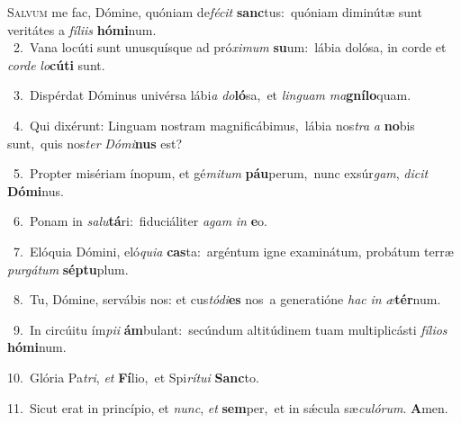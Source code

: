 \lettrine{\initial\textcolor{\initialcolor}{S}}{alvum} me fac, Dómine, quóniam de\-\textit{fé}\-\textit{cit} \textbf{sanc}\-tus:~\star quóniam diminútæ sunt veritátes a \textit{fí}\-\textit{li}\textit{is} \textbf{hó}\-\textbf{mi}num.\\
{\numbfont\textcolor{\numbcolor}{~2.}}~Vana locúti sunt unusquísque ad pró\-\textit{xi}\-\textit{mum} \textbf{su}\-um:~\star lábia dolósa, in corde et \textit{cor}\-\textit{de} \textit{lo}\-\textbf{cú}\textbf{ti} sunt.\par
{\numbfont\textcolor{\numbcolor}{~3.}}~Dispérdat Dóminus univérsa lábi\textit{a} \textit{do}\-\textbf{ló}sa,~\star et \textit{lin}\-\textit{guam} \textit{ma}\-\textbf{gní}\textbf{lo}quam.\par
{\numbfont\textcolor{\numbcolor}{~4.}}~Qui dixérunt: Linguam nostram magnificábimus,~\dagger lábia nos\textit{tra} \textit{a} \textbf{no}\-bis sunt,~\star quis nos\textit{ter} \textit{Dó}\-\textit{mi}\textbf{nus} est?\par
{\numbfont\textcolor{\numbcolor}{~5.}}~Propter misériam ínopum, et gé\-\textit{mi}\-\textit{tum} \textbf{páu}\-perum,~\star nunc exsúr\-\textit{gam}\-, \textit{di}\-\textit{cit} \textbf{Dó}\-\textbf{mi}nus.\par
{\numbfont\textcolor{\numbcolor}{~6.}}~Ponam in \textit{sa}\-\textit{lu}\textbf{tá}ri:~\star fiduciáliter \textit{a}\-\textit{gam} \textit{in} \textbf{e}\-o.\par
{\numbfont\textcolor{\numbcolor}{~7.}}~Elóquia Dómini, eló\-\textit{qui}\-\textit{a} \textbf{cas}\-ta:~\star argéntum igne examinátum, probátum terræ \textit{pur}\-\textit{gá}\textit{tum} \textbf{sép}\-\textbf{tu}plum.\par
{\numbfont\textcolor{\numbcolor}{~8.}}~Tu, Dómine, servábis nos: et cus\-\textit{tó}\-\textit{di}\textbf{es} nos~\star a generatióne \textit{hac} \textit{in} \textit{æ}\-\textbf{tér}num.\par
{\numbfont\textcolor{\numbcolor}{~9.}}~In circúitu ím\-\textit{pi}\-\textit{i} \textbf{ám}\-bulant:~\star secúndum altitúdinem tuam multiplicásti \textit{fí}\-\textit{li}\textit{os} \textbf{hó}\-\textbf{mi}num.\par
{\numbfont\textcolor{\numbcolor}{10.}}~Glória Pa\-\textit{tri}\-, \textit{et} \textbf{Fí}\-lio,~\star et Spi\-\textit{rí}\-\textit{tu}\textit{i} \textbf{Sanc}\-to.\par
{\numbfont\textcolor{\numbcolor}{11.}}~Sicut erat in princípio, et \textit{nunc}\-, \textit{et} \textbf{sem}\-per,~\star et in sǽcula sæ\-\textit{cu}\-\textit{ló}\textit{rum}. \textbf{A}\-men.\par
